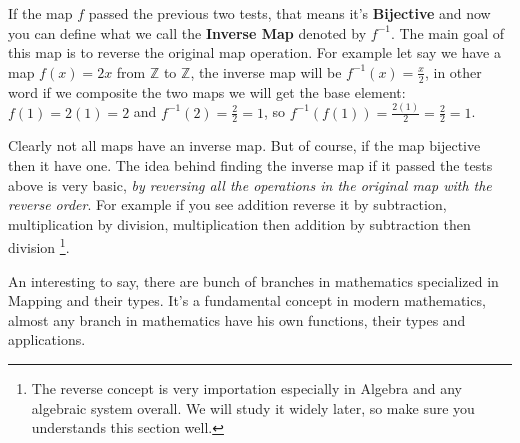 If the map $f$ passed the previous two tests, that means it's {\bf Bijective} and now you can define what we call the {\bf Inverse Map} denoted by $f^{-1}$. The main goal of this map is to reverse the original map operation. For example let say we have a map $f(x)=2x$ from $\mathbb{Z}$ to $\mathbb{Z}$, the inverse map will be $f^{-1}(x)=\frac{x}{2}$, in other word if we composite the two maps we will get the base element: $f(1)=2(1)=2$ and $f^{-1}(2)=\frac{2}{2}=1$, so $f^{-1}(f(1))=\frac{2(1)}{2}=\frac{2}{2}=1$.

Clearly not all maps have an inverse map. But of course, if the map bijective then it have one. The idea behind finding the inverse map if it passed the tests above is very basic, {\it by reversing all the operations in the original map with the reverse order}. For example if you see addition reverse it by subtraction, multiplication by division, multiplication then addition by subtraction then division \footnote{The reverse concept is very importation especially in Algebra and any algebraic system overall. We will study it widely later, so make sure you understands this section well.}.

An interesting to say, there are bunch of branches in mathematics specialized in Mapping and their types. It's a fundamental concept in modern mathematics, almost any branch in mathematics have his own functions, their types and applications.